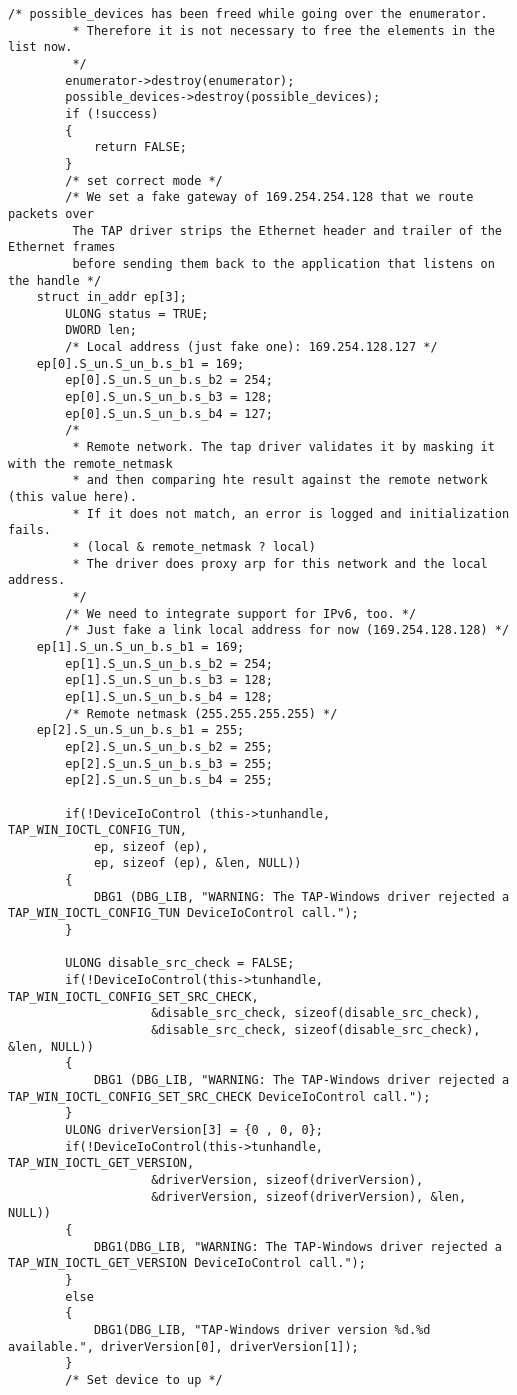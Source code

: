 \begin{lstlisting}[caption=Konfiguration eines TAP-Geräts]
        /* possible_devices has been freed while going over the enumerator.
         * Therefore it is not necessary to free the elements in the list now.
         */
        enumerator->destroy(enumerator);
        possible_devices->destroy(possible_devices);
        if (!success)
        {
            return FALSE;
        }
        /* set correct mode */
        /* We set a fake gateway of 169.254.254.128 that we route packets over
         The TAP driver strips the Ethernet header and trailer of the Ethernet frames
         before sending them back to the application that listens on the handle */
	struct in_addr ep[3];
        ULONG status = TRUE;
        DWORD len;
        /* Local address (just fake one): 169.254.128.127 */
	ep[0].S_un.S_un_b.s_b1 = 169;
        ep[0].S_un.S_un_b.s_b2 = 254;
        ep[0].S_un.S_un_b.s_b3 = 128;
        ep[0].S_un.S_un_b.s_b4 = 127;
        /*
         * Remote network. The tap driver validates it by masking it with the remote_netmask
         * and then comparing hte result against the remote network (this value here).
         * If it does not match, an error is logged and initialization fails.
         * (local & remote_netmask ? local)
         * The driver does proxy arp for this network and the local address.
         */
        /* We need to integrate support for IPv6, too. */
        /* Just fake a link local address for now (169.254.128.128) */
	ep[1].S_un.S_un_b.s_b1 = 169;
        ep[1].S_un.S_un_b.s_b2 = 254;
        ep[1].S_un.S_un_b.s_b3 = 128;
        ep[1].S_un.S_un_b.s_b4 = 128;
        /* Remote netmask (255.255.255.255) */
	ep[2].S_un.S_un_b.s_b1 = 255;
        ep[2].S_un.S_un_b.s_b2 = 255;
        ep[2].S_un.S_un_b.s_b3 = 255;
        ep[2].S_un.S_un_b.s_b4 = 255;

        if(!DeviceIoControl (this->tunhandle, TAP_WIN_IOCTL_CONFIG_TUN,
		    ep, sizeof (ep),
		    ep, sizeof (ep), &len, NULL))
        {
            DBG1 (DBG_LIB, "WARNING: The TAP-Windows driver rejected a TAP_WIN_IOCTL_CONFIG_TUN DeviceIoControl call.");
        }

        ULONG disable_src_check = FALSE;
        if(!DeviceIoControl(this->tunhandle, TAP_WIN_IOCTL_CONFIG_SET_SRC_CHECK,
                    &disable_src_check, sizeof(disable_src_check),
                    &disable_src_check, sizeof(disable_src_check), &len, NULL))
        {
            DBG1 (DBG_LIB, "WARNING: The TAP-Windows driver rejected a TAP_WIN_IOCTL_CONFIG_SET_SRC_CHECK DeviceIoControl call.");
        }
        ULONG driverVersion[3] = {0 , 0, 0};
        if(!DeviceIoControl(this->tunhandle, TAP_WIN_IOCTL_GET_VERSION,
                    &driverVersion, sizeof(driverVersion),
                    &driverVersion, sizeof(driverVersion), &len, NULL))
        {
            DBG1(DBG_LIB, "WARNING: The TAP-Windows driver rejected a TAP_WIN_IOCTL_GET_VERSION DeviceIoControl call.");
        }
        else
        {
            DBG1(DBG_LIB, "TAP-Windows driver version %d.%d available.", driverVersion[0], driverVersion[1]);
        }
        /* Set device to up */


\end{lstlisting}
